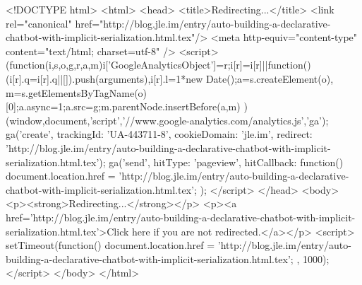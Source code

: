 <!DOCTYPE html>
<html>
<head>
<title>Redirecting...</title>
<link rel="canonical" href="http://blog.jle.im/entry/auto-building-a-declarative-chatbot-with-implicit-serialization.html.tex"/>
<meta http-equiv="content-type" content="text/html; charset=utf-8" />
<script>
(function(i,s,o,g,r,a,m){i['GoogleAnalyticsObject']=r;i[r]=i[r]||function(){
(i[r].q=i[r].q||[]).push(arguments)},i[r].l=1*new Date();a=s.createElement(o),
m=s.getElementsByTagName(o)[0];a.async=1;a.src=g;m.parentNode.insertBefore(a,m)
})(window,document,'script','//www.google-analytics.com/analytics.js','ga');
ga('create', { trackingId: 'UA-443711-8', cookieDomain: 'jle.im', redirect: 'http://blog.jle.im/entry/auto-building-a-declarative-chatbot-with-implicit-serialization.html.tex'});
ga('send', { hitType: 'pageview', hitCallback: function() { document.location.href = 'http://blog.jle.im/entry/auto-building-a-declarative-chatbot-with-implicit-serialization.html.tex'; } });
</script>
</head>
<body>
  <p><strong>Redirecting...</strong></p>
  <p><a href='http://blog.jle.im/entry/auto-building-a-declarative-chatbot-with-implicit-serialization.html.tex'>Click here if you are not redirected.</a></p>
  <script>
    setTimeout(function() { document.location.href = 'http://blog.jle.im/entry/auto-building-a-declarative-chatbot-with-implicit-serialization.html.tex'; }, 1000);
  </script>
</body>
</html>
